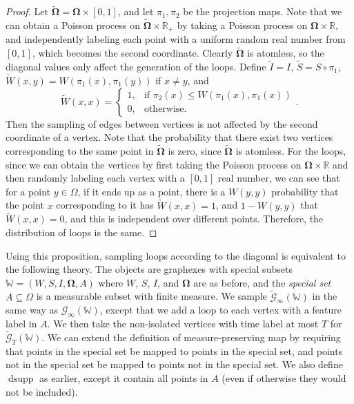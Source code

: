 \documentclass{amsart}
\numberwithin{equation}{section}
\numberwithin{figure}{section}
\theoremstyle{definition}
\theoremstyle{remark}
\DeclareMathOperator{\dsupp}{dsupp}
\newcommand{\bOmega}{{\mathbf{\Omega}}}
\newcommand{\RR}{\mathbb{R}}
\newcommand{\cW}{\mathbb{W}}
\newcommand{\cG}{\mathcal{G}}
\begin{document}
\begin{proof}
Let $\widetilde{\bOmega}=\bOmega \times [0,1]$, and let $\pi_1,\pi_2$ be the
projection maps. Note that we can obtain a Poisson process on
$\widetilde{\bOmega} \times \RR_+$ by taking a Poisson process on $\bOmega
\times \RR$, and independently labeling each point with a uniform random real
number from $[0,1]$, which becomes the second coordinate. Clearly
$\widetilde{\bOmega}$ is atomless, so the diagonal values only affect the
generation of the loops. Define $\widetilde{I}=I$, $\widetilde{S}=S \circ
\pi_1$, $\widetilde{W}(x,y)=W(\pi_1(x),\pi_1(y))$ if $x \ne y$, and
\[\widetilde{W}(x,x)= \begin{cases}
1, & \mbox{if } \pi_2(x) \le W(\pi_1(x),\pi_1(x)) \\
0, & \mbox{otherwise}.
\end{cases}
.\] Then the sampling of edges between vertices is not affected by the second
coordinate of a vertex. Note that the probability that there exist two
vertices corresponding to the same point in $\widetilde{\bOmega}$ is zero,
since $\widetilde{\bOmega}$ is atomless. For the loops, since we can obtain
the vertices by first taking the Poisson process on $\bOmega \times \RR$ and
then randomly labeling each vertex with a $[0,1]$ real number, we can see
that for a point $y \in \Omega$, if it ends up as a point, there is a
$W(y,y)$ probability that the point $x$ corresponding to it has
$\widetilde{W}(x,x)=1$, and $1-W(y,y)$ that $\widetilde{W}(x,x)=0$, and this
is independent over different points. Therefore, the distribution of loops is
the same.
\end{proof}

Using this proposition, sampling loops according to the diagonal is
equivalent to the following theory. The objects are graphexes with special
subsets $\cW=(W,S,I,\bOmega,A)$ where $W$, $S$, $I$, and $\bOmega$ are as
before, and the \emph{special set} $A \subseteq \Omega$ is a measurable
subset with finite measure. We sample $\widetilde{\cG}_\infty(\cW)$ in the
same way as $\cG_\infty(\cW)$, except that we add a loop to each vertex with
a feature label in $A$. We then take the non-isolated vertices with time
label at most $T$ for $\widetilde{\cG}_T(\cW)$. We can extend the definition
of measure-preserving map by requiring that points in the special set be
mapped to points in the special set, and points not in the special set be
mapped to points not in the special set. We also define $\dsupp$ as earlier,
except it contain all points in $A$ (even if otherwise they would not be
included).
\end{document}
